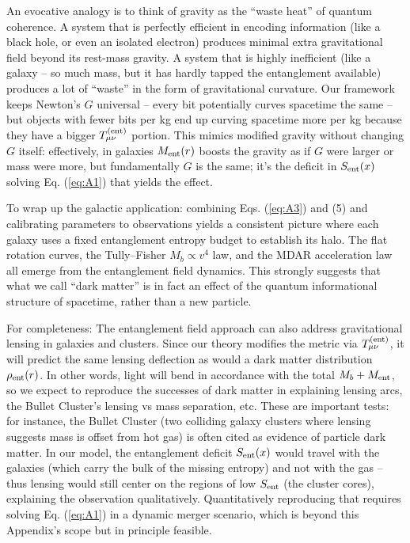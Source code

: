 \documentclass[11pt]{article}
\begin{document}
An evocative analogy is to think of gravity as the “waste heat” of quantum coherence​. A system that is perfectly efficient in encoding information (like a black hole, or even an isolated electron) produces minimal extra gravitational field beyond its rest-mass gravity. A system that is highly inefficient (like a galaxy – so much mass, but it has hardly tapped the entanglement available) produces a lot of “waste” in the form of gravitational curvature. Our framework keeps Newton’s $G$ universal – every bit potentially curves spacetime the same – but objects with fewer bits per kg end up curving spacetime more per kg because they have a bigger $T^{\rm (ent)}_{\mu\nu}$ portion. This mimics modified gravity without changing $G$ itself: effectively, in galaxies $M_{\rm ent}(r)$ boosts the gravity as if $G$ were larger or mass were more, but fundamentally $G$ is the same; it’s the deficit in $S_{\rm ent}(x)$ solving Eq. (\ref{eq:A1}) that yields the effect.

To wrap up the galactic application: combining Eqs. (\ref{eq:A3}) and (5) and calibrating parameters to observations yields a consistent picture where each galaxy uses a fixed entanglement entropy budget to establish its halo. The flat rotation curves, the Tully–Fisher $M_b \propto v^4$ law, and the MDAR acceleration law all emerge from the entanglement field dynamics​. This strongly suggests that what we call “dark matter” is in fact an effect of the quantum informational structure of spacetime, rather than a new particle.

For completeness: The entanglement field approach can also address gravitational lensing in galaxies and clusters. Since our theory modifies the metric via $T_{\mu\nu}^{\rm (ent)}$, it will predict the same lensing deflection as would a dark matter distribution $\rho_{\rm ent}(r)$. In other words, light will bend in accordance with the total $M_b + M_{\rm ent}$, so we expect to reproduce the successes of dark matter in explaining lensing arcs, the Bullet Cluster’s lensing vs mass separation, etc. These are important tests: for instance, the Bullet Cluster (two colliding galaxy clusters where lensing suggests mass is offset from hot gas) is often cited as evidence of particle dark matter. In our model, the entanglement deficit $S_{\rm ent}(x)$ would travel with the galaxies (which carry the bulk of the missing entropy) and not with the gas – thus lensing would still center on the regions of low $S_{\rm ent}$ (the cluster cores), explaining the observation qualitatively. Quantitatively reproducing that requires solving Eq. (\ref{eq:A1}) in a dynamic merger scenario, which is beyond this Appendix’s scope but in principle feasible.
\end{document}
